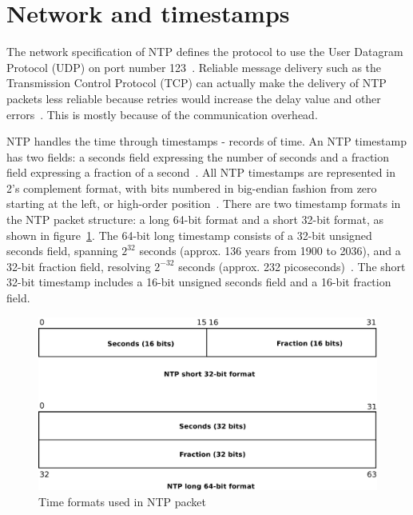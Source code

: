 
\section{Network and timestamps}\label{sec:ntp-network}
The network specification of NTP defines
the protocol to use the User Datagram Protocol (UDP) on port number 123~\cite{ianna-ports,rfc5905}.
Reliable message delivery such as the Transmission Control Protocol (TCP)
can actually make the delivery of
NTP packets less reliable because retries
would increase the delay value and other errors~\cite{rfc5905}.
This is mostly because of the communication overhead.

NTP handles the time through timestamps - records of time.
An NTP timestamp has two fields: a seconds field expressing the number of seconds
and a fraction field expressing a fraction of a second~\cite{rfc5905}.
All NTP timestamps are represented in 2's complement format, with
bits numbered in big-endian fashion from zero starting at the left, or high-order position~\cite{rfc5905}.
There are two timestamp formats in the NTP packet structure:
a long 64-bit format and a short 32-bit format, as shown in figure~\ref{fig:ntp-timestamps}.
The 64-bit long timestamp consists of a 32-bit unsigned seconds
field, spanning $2^{32}$ seconds (approx. 136 years from 1900 to 2036), and a 32-bit fraction field, resolving
$2^{-32}$ seconds (approx. 232 picoseconds)~\cite{rfc5905}.
The short 32-bit timestamp includes a 16-bit unsigned seconds field
and a 16-bit fraction field.

\begin{figure}
	\centering
	\includegraphics[width=13cm,keepaspectratio]{fig/ntp-timestamps.pdf}
	\caption{Time formats used in NTP packet}
	\label{fig:ntp-timestamps}
	\bigskip
\end{figure}

